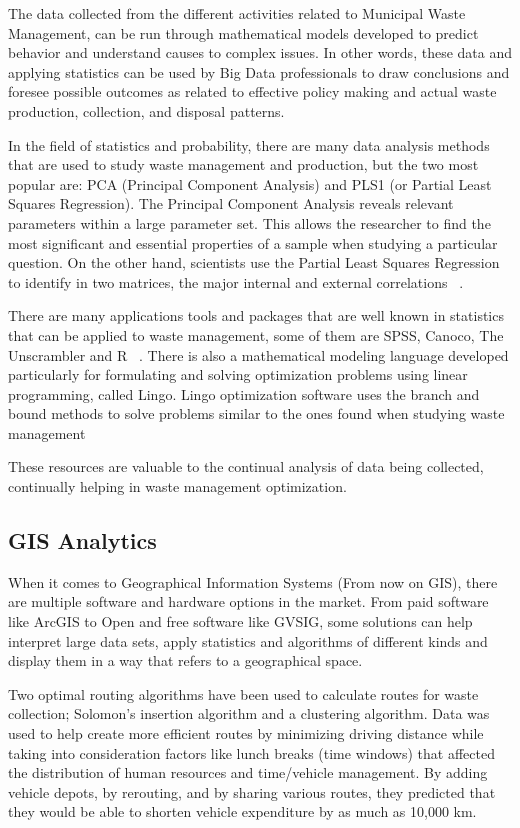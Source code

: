 \documentclass[sigconf]{acmart}
\begin{document}
The data collected from the different activities related to Municipal Waste Management, can be run through mathematical models developed to predict behavior and understand causes to complex issues. In other words, these data and applying statistics can be used by Big Data professionals to draw conclusions and foresee possible outcomes as related to effective policy making and actual waste production, collection, and disposal patterns. 

In the field of statistics and probability, there are many data analysis methods that are used to  study waste management and production, but the two most popular are: PCA  (Principal Component Analysis) and PLS1 (or Partial Least Squares Regression).  The Principal Component Analysis  reveals relevant parameters within a large parameter set. This allows the researcher to find the most significant and essential properties of a sample when studying a particular question. On the other hand, scientists use the Partial Least Squares Regression to identify in two matrices, the major internal and external correlations ~\cite{bohm2013}.

There are many applications tools and packages that are well known in statistics that can be applied to waste management, some of them are SPSS, Canoco, The Unscrambler and R ~\cite{bohm2013}.
There is also  a mathematical modeling language developed  particularly for formulating and solving  optimization problems using linear programming, called Lingo. Lingo optimization software uses the branch and bound methods to solve problems similar to the ones found when studying waste management ~\cite{akbarpour2016}

These resources are valuable to the continual analysis of data being collected, continually helping in waste management optimization.

\subsection{GIS Analytics}

When it comes to Geographical Information Systems (From now on GIS), there are multiple software and hardware options in the market. From paid software like ArcGIS to Open and free software like GVSIG, some solutions can help interpret large data sets, apply statistics and algorithms of different kinds and display them in a way that refers to a geographical space. 

Two optimal routing algorithms have been used to calculate routes for waste collection; Solomon's insertion algorithm and a clustering algorithm.  Data was used to help create more efficient routes by minimizing driving distance while taking into consideration factors like lunch breaks (time windows) that affected the distribution of human resources and time/vehicle management.  By adding vehicle depots, by rerouting, and by sharing various routes, they predicted that they would be able to shorten vehicle expenditure by as much as 10,000 km.  
\end{document}
